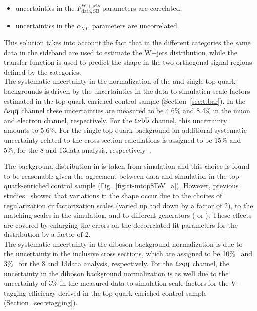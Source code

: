 \begin{itemize}
\item uncertainties in the $F_\mathrm{data, SB}^{\mathrm{W+jets}}$ parameters are correlated;
\item uncertainties in the $\alpha_\mathrm{MC}$ parameters are uncorrelated.
\end{itemize}

This solution takes into account the fact that in the different \mJ categories the same data in the sideband are used to estimate the W+jets distribution, while the transfer function is used to predict the shape in the two orthogonal signal regions defined by the categories.\\

The systematic uncertainty in the normalization of the \ttbar and single-top-quark backgrounds is driven by the uncertainties in the data-to-simulation scale factors estimated in the top-quark-enriched control sample (Section~\ref{sec:ttbar}). In the $\ell\nu\mathrm{q}\overline{\mathrm{q}}$ channel these uncertainties are measured to be 4.6\% and 8.4\% in the muon and electron channel, respectively. For the $\ell\nu{\mathrm{b}\overline{\mathrm{b}}}$ channel, this uncertainty amounts to 5.6\%.
For the single-top-quark background an additional systematic uncertainty related to the cross section calculations is assigned to be 15\% and 5\%, for the 8 and 13\TeV data analysis, respectively~\cite{Chatrchyan:2012ep,Kant:2014oha}.

The \ttbar background distribution in \mlvj is taken from simulation and this choice is found to be reasonable given the
agreement between data and simulation in the top-quark-enriched control sample (Fig.~\ref{fig:tt-mtop8TeV_a}).
However, previous studies~\cite{Khachatryan:2014gha} showed that variations in the shape occur due to the choices of regularization or factorization scales (varied up and down by a factor of 2),
to the matching scales in the \MADGRAPH{} simulation, and to different generators (\MADGRAPH{} or \POWHEG{}).
These effects are covered by enlarging the errors on the decorrelated fit parameters for the \ttbar distribution by a factor of 2.\\

The systematic uncertainty in the diboson background normalization is due to the uncertainty in the inclusive cross sections, which are assigned to be 10\%~\cite{Chatrchyan:2013oev} and 3\%~\cite{Gehrmann:2014fva} for the 8 and 13\TeV data analysis, respectively.
For the $\ell\nu\mathrm{q}\overline{\mathrm{q}}$ channel, the uncertainty in the diboson background normalization is as well due to the uncertainty of 3\% in the measured data-to-simulation scale factors for the V-tagging efficiency derived in the top-quark-enriched control sample (Section~\ref{sec:vtagging}).\\

